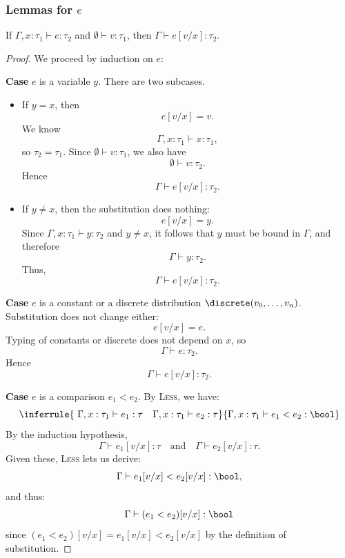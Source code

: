 \subsubsection{Lemmas for $e$}

\begin{lemma}[Substitution]\label{lem:substitution}
	If $\Gamma, x : \tau_1 \vdash e : \tau_2$ and $\emptyset \vdash v : \tau_1$, then $\Gamma \vdash e[v/x] : \tau_2$. 
\end{lemma}

\begin{proof}
	We proceed by induction on $e$:

	\textbf{Case} $e$ is a variable $y$. There are two subcases. 

	\begin{itemize}
		\item If $y = x$, then
		\[
			e[v/x] = v.
		\]
		We know
		\[
			\Gamma, x : \tau_1 \vdash x : \tau_1,
		\]
		so $\tau_2 = \tau_1$. Since $\emptyset \vdash v : \tau_1$, we also have
		\[
			\emptyset \vdash v : \tau_2.
		\]
		Hence
		\[
			\Gamma \vdash e[v/x] : \tau_2.
		\]

		\item If $y \neq x$, then the substitution does nothing:
		\[
			e[v/x] = y.
		\]
		Since $\Gamma, x : \tau_1 \vdash y : \tau_2$ and $y \neq x$, it follows that $y$ must be bound in $\Gamma$, and therefore
		\[
			\Gamma \vdash y : \tau_2.
		\]
		Thus,
		\[
			\Gamma \vdash e[v/x] : \tau_2.
		\]
	\end{itemize}

	\textbf{Case} $e$ is a constant or a discrete distribution $\discrete(v_0,\ldots,v_n)$. Substitution does not change either:
	\[
		e[v/x] = e.
	\]
	Typing of constants or discrete does not depend on $x$, so
	\[
		\Gamma \vdash e : \tau_2.
	\]
	Hence
	\[
		\Gamma \vdash e[v/x] : \tau_2.
	\]

	\textbf{Case} $e$ is a comparison $e_1 < e_2$. By \textsc{Less}, we have:
	\[
		\inferrule
		{\ \Gamma, x : \tau_1 \vdash e_1 : \tau \quad \Gamma, x : \tau_1 \vdash e_2 : \tau}
		{\Gamma, x : \tau_1 \vdash e_1 < e_2 : \bool}
	\]
	By the induction hypothesis,
	\[
		\Gamma \vdash e_1[v/x] : \tau
		\quad\text{and}\quad
		\Gamma \vdash e_2[v/x] : \tau.
	\]
	Given these, \textsc{Less} lets us derive:
	\[
		\Gamma \vdash e_1[v/x] < e_2[v/x] : \bool,
	\]
	and thus:
	\[
		\Gamma \vdash (e_1 < e_2)[v/x] : \bool
	\]
	since $(e_1 < e_2)[v/x] = e_1[v/x] < e_2[v/x]$ by the definition of substitution.


\end{proof}
